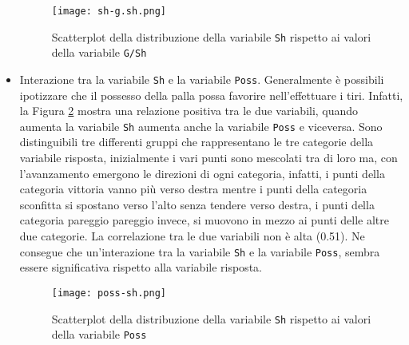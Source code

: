 \begin{itemize}
	\begin{figure}[htbp]
		\begin{center}
			\texttt{[image: sh-g.sh.png]}
			\caption{Scatterplot della distribuzione della variabile \texttt{Sh} rispetto ai valori della variabile \texttt{G/Sh}}  \label{fig:shgol}
		\end{center}
	\end{figure}
	
	\item Interazione tra la variabile \texttt{Sh} e la variabile \texttt{Poss}. Generalmente è possibili ipotizzare che il possesso della palla possa favorire nell’effettuare i tiri. Infatti, la Figura \ref{fig:shposs} mostra una relazione positiva tra le due variabili, quando aumenta la variabile \texttt{Sh} aumenta anche la variabile \texttt{Poss} e viceversa. Sono distinguibili tre differenti gruppi che rappresentano le tre categorie della variabile risposta, inizialmente i vari punti sono mescolati tra di loro ma, con l'avanzamento emergono le direzioni di ogni categoria, infatti, i punti della categoria vittoria vanno più verso destra mentre i punti della categoria sconfitta si spostano verso l'alto senza tendere verso destra, i punti della categoria pareggio pareggio invece, si muovono in mezzo ai punti delle altre due categorie. La correlazione tra le due variabili non è alta (0.51). Ne consegue che un'interazione tra la variabile \texttt{Sh} e la variabile \texttt{Poss}, sembra essere significativa rispetto alla variabile risposta.
	
	\begin{figure}[htbp]
		\begin{center}
			\texttt{[image: poss-sh.png]}
			\caption{Scatterplot della distribuzione della variabile \texttt{Sh} rispetto ai valori della variabile \texttt{Poss}}  \label{fig:shposs}
		\end{center}
	\end{figure}
\end{itemize}


